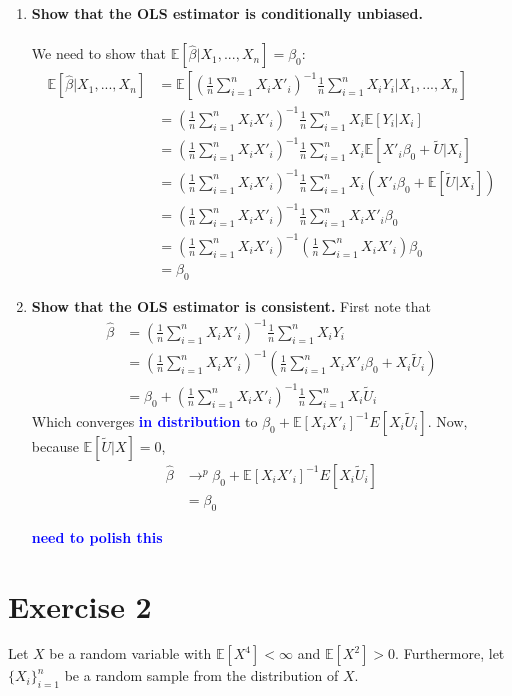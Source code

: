 \documentclass[]{article}
\newcommand{\sumin}{\sum\limits_{i=1}^n} %
\newcommand{\E}{\mathbb{E}}
\newcommand{\fix} [1] {\textbf{\textcolor{blue}{#1}}} %
\begin{document}
\begin{enumerate}[label = (\roman*)]
\item \textbf{Show that the OLS estimator is conditionally unbiased.}\\
\\
We need to show that $\E[\hat{\beta}|X_1,...,X_n] = \beta_0$:
\begin{align*}
\E[\hat{\beta}|X_1,...,X_n] 
& = \E\left[\left(\frac{1}{n} \sumin X_iX'_i\right)^{-1} \frac{1}{n} \sumin X_iY_i\bigg|X_1,...,X_n\right]
\\
& = \left(\frac{1}{n} \sumin X_iX'_i\right)^{-1} 
    \frac{1}{n}\sumin X_i \E[Y_i|X_i]
\\
& = \left(\frac{1}{n} \sumin X_iX'_i\right)^{-1} 
    \frac{1}{n}\sumin X_i 
    \E[X'_i\beta_0 + \tilde{U}|X_i]
\\
& = \left(\frac{1}{n} \sumin X_iX'_i\right)^{-1} 
    \frac{1}{n}\sumin X_i (
    X'_i\beta_0 + \E[\tilde{U}|X_i])
\\
& = \left(\frac{1}{n} \sumin X_iX'_i\right)^{-1} 
    \frac{1}{n}\sumin X_i X'_i\beta_0
\\
& = \left(\frac{1}{n} \sumin X_iX'_i\right)^{-1} 
    \left(\frac{1}{n}\sumin X_i X'_i\right)\beta_0
\\
& = \beta_0
\end{align*}


\item \textbf{Show that the OLS estimator is consistent.}
First note that 
\begin{align*}
\hat{\beta} & = \left(\frac{1}{n} \sumin X_iX'_i\right)^{-1} \frac{1}{n} \sumin X_iY_i\\
& = \left(\frac{1}{n} \sumin X_iX'_i\right)^{-1} \left(\frac{1}{n} \sumin X_iX'_i\beta_0 + X_i\tilde{U}_i\right) \\
& = \beta_0 + \left(\frac{1}{n} \sumin X_iX'_i\right)^{-1} \frac{1}{n} \sumin X_i\tilde{U}_i
\end{align*}
Which converges \fix{in distribution} to $\beta_0 + \E[X_iX'_i]^{-1} E[X_i\tilde{U}_i]$. Now, because $\mathbb{E} [\tilde{U}|X] = 0$,
\begin{align*}
\hat{\beta} 
& \rightarrow^p \beta_0 + \E[X_iX'_i]^{-1} E[X_i\tilde{U}_i] \\
& = \beta_0 
\end{align*}

\fix{need to polish this}

\end{enumerate}


\section*{Exercise 2} 
Let $X$ be a random variable with $\E[X^4]<\infty$ and $\E[X^2] > 0$. Furthermore, let $\{X_i\}^n_{i=1}$ be a random sample from the distribution of $X$.
\end{document}
